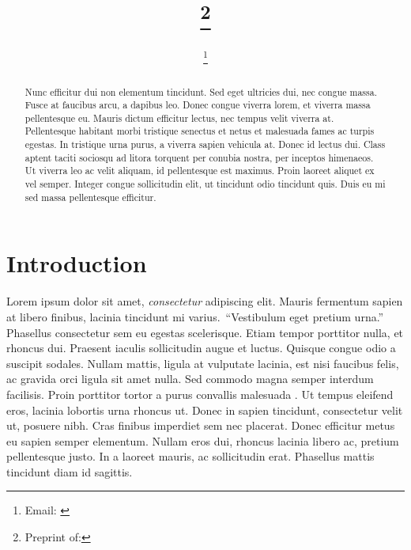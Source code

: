\documentclass[12pt,letterpaper]{article} %
\begin{document}
\title{\papertitle\footnote{{Preprint of: \papercitation}}}
\author[]{\myname\footnote{Email: \href{mailto:\myemail}{\myemail}}}
\affil[]{\myaffiliation}
\date{\paperdate}

\maketitle

\begin{abstract}
Nunc efficitur dui non elementum tincidunt. Sed eget ultricies dui, nec congue massa. Fusce at faucibus arcu, a dapibus leo. Donec congue viverra lorem, et viverra massa pellentesque eu. Mauris dictum efficitur lectus, nec tempus velit viverra at. Pellentesque habitant morbi tristique senectus et netus et malesuada fames ac turpis egestas. In tristique urna purus, a viverra sapien vehicula at. Donec id lectus dui. Class aptent taciti sociosqu ad litora torquent per conubia nostra, per inceptos himenaeos. Ut viverra leo ac velit aliquam, id pellentesque est maximus. Proin laoreet aliquet ex vel semper. Integer congue sollicitudin elit, ut tincidunt odio tincidunt quis. Duis eu mi sed massa pellentesque efficitur.
\vspace{1cm}
\end{abstract}


\section{Introduction}

Lorem ipsum dolor sit amet, \emph{consectetur} adipiscing elit. Mauris fermentum sapien at libero finibus, lacinia tincidunt mi varius.\ \enquote{Vestibulum eget pretium urna.} Phasellus consectetur sem eu egestas scelerisque. Etiam tempor porttitor nulla, et rhoncus dui. Praesent iaculis sollicitudin augue et luctus. Quisque congue odio a suscipit sodales. Nullam mattis, ligula at vulputate lacinia, est nisi faucibus felis, ac gravida orci ligula sit amet nulla. Sed commodo magna semper interdum facilisis. Proin porttitor tortor a purus convallis malesuada \citep{boeing_off_2021}. Ut tempus eleifend eros, lacinia lobortis urna rhoncus ut. Donec in sapien tincidunt, consectetur velit ut, posuere nibh. Cras finibus imperdiet sem nec placerat. Donec efficitur metus eu sapien semper elementum. Nullam eros dui, rhoncus lacinia libero ac, pretium pellentesque justo. In a laoreet mauris, ac sollicitudin erat. Phasellus mattis tincidunt diam id sagittis.
\end{document}
